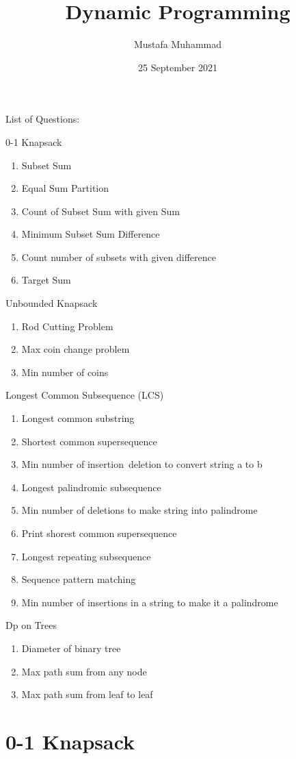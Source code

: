 \documentclass[24pt, a4]{article}
\title{Dynamic Programming}
\author{Mustafa Muhammad}
\date{25 September 2021}
\begin{document}
\maketitle

\newpage

List of Questions:

0-1 Knapsack
\begin{enumerate}
  \item Subset Sum
  \item Equal Sum Partition
  \item Count of Subset Sum with given Sum
  \item Minimum Subset Sum Difference
  \item Count number of subsets with given difference
  \item Target Sum
\end{enumerate}
Unbounded Knapsack
\begin{enumerate}
	\item Rod Cutting Problem
	\item Max coin change problem
	\item Min number of coins
\end{enumerate}
Longest Common Subsequence (LCS)
\begin{enumerate}
	\item Longest common substring
	\item Shortest common supersequence
	\item Min number of insertion\ deletion to convert string a to b
	\item Longest palindromic subsequence
	\item Min number of deletions to make string into palindrome
	\item Print shorest common supersequence
	\item Longest repeating subsequence
	\item Sequence pattern matching
	\item Min number of insertions in a string to make it a palindrome
\end{enumerate}
Dp on Trees 
\begin{enumerate}
	\item Diameter of binary tree
	\item Max path sum from any node
	\item Max path sum from leaf to leaf
\end{enumerate}

\newpage

\section{0-1 Knapsack}
\end{document}
